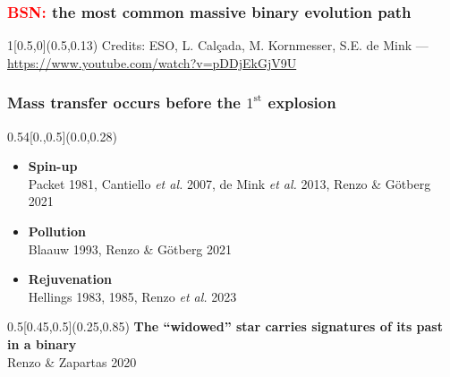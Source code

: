 \documentclass[xcolor=dvipsnames,professionalfonts, aspectratio=169]{beamer}
\begin{document}
\begin{frame}
  \frametitle{\textcolor{red}{BSN:} the most common massive binary evolution path}
  \centering
  \vspace*{8pt}


  \begin{textblock}{1}[0.5,0](0.5,0.13)
    \textcolor{gray!50}{\tiny Credits: ESO, L. Calçada, M. Kornmesser,
      S.E. de Mink  --- \url{https://www.youtube.com/watch?v=pDDjEkGjV9U}}
  \end{textblock}
\end{frame}



\bgroup
{}
\begin{frame}[plain]


  \frametitle{\textcolor{white!80!Yellow}{Mass
      transfer occurs before the  $1^\mathrm{st}$ explosion}}
  \begin{textblock}{0.54}[0.,0.5](0.0,0.28)
    \centering
    \begin{itemize}
    \item[\textcolor{white!80!Yellow}{\textbullet}]
      \textcolor{white!80!Yellow}{\bf Spin-up}\\[-4pt]
      \textcolor{gray!50}{\tiny Packet 1981, Cantiello \emph{et al.}
        2007, de Mink \emph{et al.} 2013, Renzo \& G\"otberg 2021}\\[3pt]
    \item[\textcolor{white!80!Yellow}{\textbullet}]
      \textcolor{white!80!Yellow}{\bf Pollution}\\[-4pt]
      \textcolor{gray!50}{\tiny Blaauw 1993, Renzo \& G\"otberg 2021}\\[3pt]
    \item[\textcolor{white!80!Yellow}{\textbullet}]
      \textcolor{white!80!Yellow}{\bf Rejuvenation}\\[-4pt]
      \textcolor{gray!50}{\tiny Hellings 1983, 1985, Renzo \emph{et al.} 2023}
    \end{itemize}
  \end{textblock}
  \begin{textblock}{0.5}[0.45,0.5](0.25,0.85)
    \centering
    \textcolor{whiteish}{
      \bf The ``widowed'' star carries signatures of its past in a binary}\\[-2pt]
    \hfill\textcolor{gray!50}{\tiny Renzo \& Zapartas 2020}\ \,
  \end{textblock}
\end{frame}
\egroup
\end{document}
